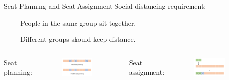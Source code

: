     \begin{frame}{Seat Planning and Seat Assignment}
      Social distancing requirement: 
      
      \begin{itemize}
        \item[-] People in the same group sit together.
        \item[-] Different groups should keep distance.
      \end{itemize}
      
      \vspace{1cm}

      \begin{columns}
        \column{5cm}  %
        Seat planning: 
          \begin{figure}[ht]
            \centering
            \includegraphics[width = 0.8\textwidth]{./images/seat_planning.png}
          \end{figure}
          \column{5cm}
        Seat assignment: 
          \scriptsize
          \begin{figure}[ht]
            \centering
            \includegraphics[width = 0.8\textwidth]{./images/seat_assignment.png}
          \end{figure}
      \end{columns}
    
    \end{frame}
    

